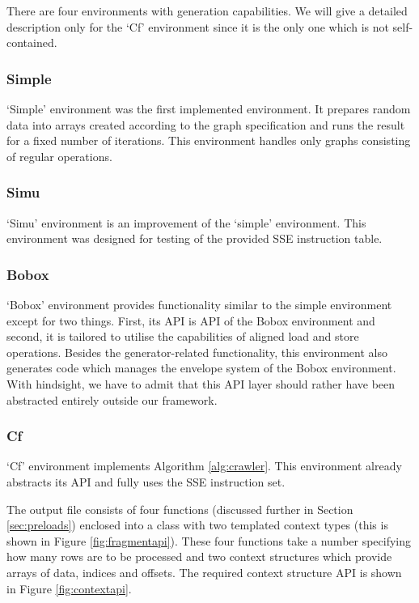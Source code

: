 \label{sec:env2}
There are four environments with generation capabilities. We will give a detailed description only for the `Cf' environment since it is the only one which is not self-contained.

\subsubsection{Simple}
`Simple' environment was the first implemented environment. It prepares random data into arrays created according to the graph specification and runs the result for a fixed number of iterations. This environment handles only graphs consisting of regular operations.

\subsubsection{Simu}
`Simu' environment is an improvement of the `simple' environment. This environment was designed for testing of the provided SSE instruction table.

\subsubsection{Bobox}
`Bobox' environment provides functionality similar to the simple environment except for two things. First, its API is API of the Bobox environment and second, it is tailored to utilise the capabilities of aligned load and store operations. Besides the generator-related functionality, this environment also generates code which manages the envelope system of the Bobox environment. With hindsight, we have to admit that this API layer should rather have been abstracted entirely outside our framework. 

  \subsubsection{Cf}
  `Cf' environment implements Algorithm \ref{alg:crawler}. This environment already abstracts its API and fully uses the SSE instruction set.
    
    The output file consists of four functions (discussed further in Section \ref{sec:preloads}) enclosed into a class with two templated context types (this is shown in Figure \ref{fig:fragmentapi}). These four functions take a number specifying how many rows are to be processed and two context structures which provide arrays of data, indices and offsets. The required context structure API is shown in Figure \ref{fig:contextapi}. 

